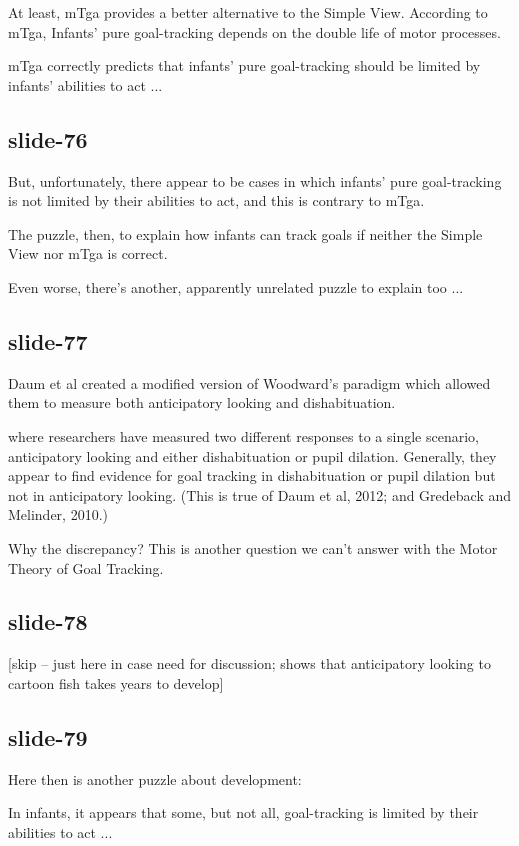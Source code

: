 \documentclass[12pt,\papersize]{extarticle}
\begin{document}
At least, mTga provides a better alternative to the Simple View.
According to mTga,
Infants’ pure goal-tracking depends on the double life of motor processes.
 
mTga correctly predicts that infants’ pure goal-tracking should be limited by infants’
abilities to act ...
 
\subsection{slide-76}
But, unfortunately, there appear to be cases in which infants’ pure goal-tracking
is not limited by their abilities to act, and this is contrary to mTga.
 
The puzzle, then, to explain how infants can track goals if neither the Simple View
nor mTga is correct.
 
Even worse, 
there’s another, apparently unrelated puzzle to explain too ...
 
\subsection{slide-77}
Daum et al created a modified version of Woodward’s paradigm which allowed them to measure
both anticipatory looking and dishabituation.
 
where researchers have measured two different responses to a single
scenario, anticipatory looking and either dishabituation or pupil dilation.
Generally, they appear to find evidence for goal tracking in dishabituation
or pupil dilation but not in anticipatory looking. 
(This is true of Daum et al, 2012; and Gredeback and Melinder, 2010.)
 
Why the discrepancy?
This is another question we can’t answer with the Motor Theory of Goal
Tracking.
 
\subsection{slide-78}
[skip -- just here in case need for discussion; shows that anticipatory looking
to cartoon fish takes years to develop]
 
\subsection{slide-79}
Here then is another puzzle about development:
 
In infants, 
it appears that 
some, 
but not all, 
goal-tracking is limited by their abilities to act ...
 
\end{document}
